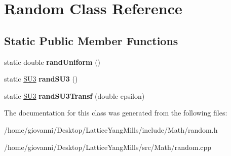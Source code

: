 \hypertarget{classRandom}{}\section{Random Class Reference}
\label{classRandom}
\subsection*{Static Public Member Functions}
\begin{DoxyCompactItemize}
\item 
static double {\bfseries rand\+Uniform} ()\hypertarget{classRandom_a85d1fc4b7dd6a2a659c02101a87f7a46}{}\label{classRandom_a85d1fc4b7dd6a2a659c02101a87f7a46}

\item 
static \hyperlink{structSU3}{S\+U3} {\bfseries rand\+S\+U3} ()\hypertarget{classRandom_ac5292fc838c1321ef8657947456a3970}{}\label{classRandom_ac5292fc838c1321ef8657947456a3970}

\item 
static \hyperlink{structSU3}{S\+U3} {\bfseries rand\+S\+U3\+Transf} (double epsilon)\hypertarget{classRandom_a1999be7abe21383e442a5ef96fe836f4}{}\label{classRandom_a1999be7abe21383e442a5ef96fe836f4}

\end{DoxyCompactItemize}


The documentation for this class was generated from the following files\+:\begin{DoxyCompactItemize}
\item 
/home/giovanni/\+Desktop/\+Lattice\+Yang\+Mills/include/\+Math/random.\+h\item 
/home/giovanni/\+Desktop/\+Lattice\+Yang\+Mills/src/\+Math/random.\+cpp\end{DoxyCompactItemize}
